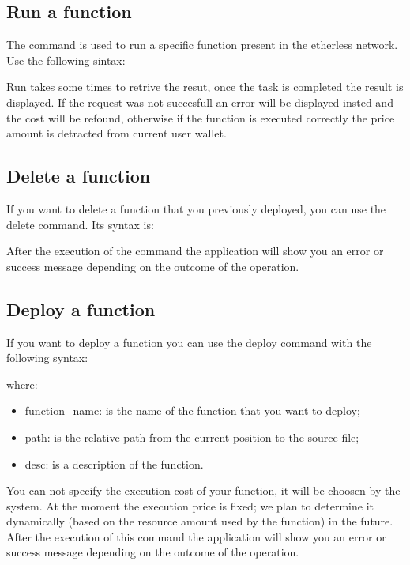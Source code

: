 \subsection{Run a function}
The command is used to run a specific function present in the etherless network. Use the following sintax: \\
\begin{center}
\end{center}
Run takes some times to retrive the resut, once the task is completed the result is displayed. If the request was not succesfull an error will be displayed insted and the cost will be refound, otherwise if the function is executed correctly the price amount is detracted from current user wallet. 

\subsection{Delete a function}
If you want to delete a function that you previously deployed, you can use the delete command. Its syntax is: 
\begin{center}
\end{center}
After the execution of the command  the application will show you an error or success message depending on the outcome of the operation. 

\subsection{Deploy a function}
If you want to deploy a function you can use the deploy command with the following syntax: 
\begin{center}
\end{center}
\noindent where: 
\begin{itemize}
	\item function\_name: is the name of the function that you want to deploy; 
	\item path: is the relative path from the current position to the source file; 
	\item desc: is a description of the function. 
\end{itemize} 
You can not specify the execution cost of your function, it will be choosen by the system. At the moment the execution price is fixed; we plan to determine it dynamically (based on the resource amount used by the function) in the future. After the execution of this command  the application will show you an error or success message depending on the outcome of the operation. 

